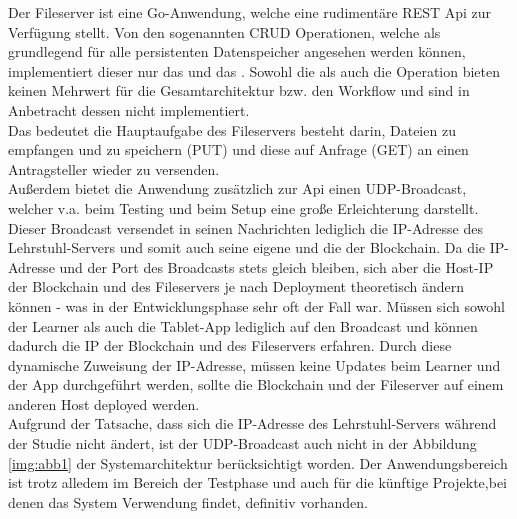 Der Fileserver ist eine Go-Anwendung, welche eine rudimentäre REST \cite{REST:Wiki} Api \cite{API:Wiki} zur Verfügung stellt.
Von den sogenannten CRUD \cite{CRUD:Wiki} Operationen, welche als grundlegend für alle persistenten Datenspeicher angesehen werden können, implementiert dieser nur das  und das . Sowohl die  als auch die  Operation bieten keinen Mehrwert für die Gesamtarchitektur bzw. den Workflow und sind in Anbetracht dessen nicht implementiert.\\
Das bedeutet die Hauptaufgabe des Fileservers besteht darin, Dateien zu empfangen und zu speichern (PUT) und diese auf Anfrage (GET) an einen Antragsteller wieder zu versenden.\\
Außerdem bietet die Anwendung zusätzlich zur Api einen UDP-Broadcast, welcher v.a. beim Testing und beim Setup eine große Erleichterung darstellt. Dieser Broadcast versendet in seinen Nachrichten lediglich die IP-Adresse des Lehrstuhl-Servers und somit auch seine eigene und die der Blockchain.
Da die IP-Adresse und der Port des Broadcasts stets gleich bleiben, sich aber die Host-IP der Blockchain und des Fileservers je nach Deployment theoretisch ändern können - was in der Entwicklungsphase sehr oft der Fall war. Müssen sich sowohl der Learner als auch die Tablet-App lediglich auf den Broadcast  und können dadurch die IP der Blockchain und des Fileservers erfahren. Durch diese dynamische Zuweisung der IP-Adresse, müssen keine Updates beim Learner und der App durchgeführt werden, sollte die Blockchain und der Fileserver auf einem anderen Host deployed werden. \\
Aufgrund der Tatsache, dass sich die IP-Adresse des Lehrstuhl-Servers während der Studie nicht ändert, ist der UDP-Broadcast auch nicht in der Abbildung \ref{img:abb1} der Systemarchitektur berücksichtigt worden. Der Anwendungsbereich ist trotz alledem im Bereich der Testphase und auch für die künftige Projekte,bei denen das System Verwendung findet, definitiv vorhanden.

